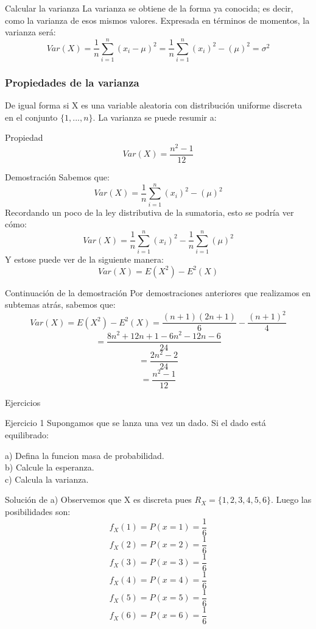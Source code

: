 \documentclass[11pt]{beamer}
\begin{document}
\begin{frame}{Calcular la varianza}
La varianza se obtiene de la forma ya conocida; es decir, como la varianza de esos mismos valores. Expresada en términos de momentos, la varianza será:
$$Var(X)=\dfrac{1}{n}\sum_{i=1}^{n}(x_{i}-\mu)^{2}= \dfrac{1}{n}\sum_{i=1}^{n}(x_{i})^2 - (\mu)^{2} =\sigma ^{2}$$
\end{frame} 

\begin{frame}\frametitle{Propiedades de la varianza}
De igual forma si X es una variable aleatoria  con distribución uniforme discreta en el conjunto $\lbrace 1,...,n \rbrace$. La varianza se puede resumir a:
\begin{block}{Propiedad}
$$Var(X) = \dfrac{n^{2} - 1}{12}$$
\end{block}
\end{frame}

\begin{frame}{Demostración}
Sabemos que:
$$Var(X)= \dfrac{1}{n}\sum_{i=1}^{n}(x_{i})^2 -(\mu)^{2}$$
Recordando un poco de la ley distributiva de la sumatoria, esto se podría ver cómo:
$$Var(X) =  \dfrac{1}{n}\sum_{i=1}^{n}(x_{i})^2 - \dfrac{1}{n}\sum_{i=1}^{n}(\mu)^{2}$$
Y estose puede ver de la siguiente manera:
$$Var(X) =E(X^2) - E^2(X)$$
\end{frame}

\begin{frame}{Continuación de la demostración}
Por demostraciones anteriores que realizamos en subtemas atrás, sabemos que:
$$Var(X) = E(X^2) - E^2(X)= \dfrac{(n + 1)(2n + 1)}{6} - \dfrac{(n +1)^2}{4}$$
$$=\dfrac{8n^2 + 12n + 1 - 6n^2 - 12n - 6}{24}$$
$$= \dfrac{2n^2 - 2}{24}$$
$$= \dfrac{n^2 - 1}{12}$$
\end{frame}

\begin{frame}{Ejercicios}
\begin{block}{Ejercicio 1}
Supongamos que se lanza una vez un dado. Si el dado está equilibrado:

a) Defina la funcion masa de probabilidad.\\
b) Calcule la esperanza.\\
c) Calcula la varianza.
\end{block}
\end{frame}

\begin{frame}{Solución de a)}
Observemos que X es discreta pues $R_{X}=\lbrace 1, 2, 3, 4, 5, 6 \rbrace$. Luego las posibilidades son:
$$f_{X}(1)=P(x=1)=\dfrac{1}{6}$$
$$f_{X}(2)=P(x=2)=\dfrac{1}{6}$$$$f_{X}(3)=P(x=3)=\dfrac{1}{6}$$
$$f_{X}(4)=P(x=4)=\dfrac{1}{6}$$
$$f_{X}(5)=P(x=5)=\dfrac{1}{6}$$
$$f_{X}(6)=P(x=6)=\dfrac{1}{6}$$
\end{frame}
\end{document}
